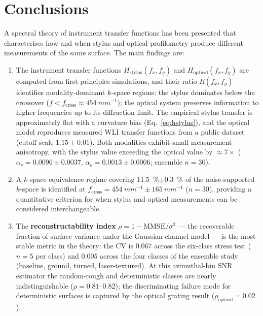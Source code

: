 \documentclass[review,12pt]{elsarticle}
\begin{document}
\section{Conclusions}

A spectral theory of instrument transfer functions has been presented that characterises how and when stylus and optical profilometry produce different measurements of the same surface. The main findings are:

\begin{enumerate}
    \item The instrument transfer functions $H_\mathrm{stylus}(f_x,f_y)$ and $H_\mathrm{optical}(f_x,f_y)$ are computed from first-principles simulations, and their ratio $R(f_x,f_y)$ identifies modality-dominant $k$-space regions: the stylus dominates below the crossover ($f < f_\mathrm{cross} \approx \SI{454}{mm^{-1}}$); the optical system preserves information to higher frequencies up to its diffraction limit. The empirical stylus transfer is approximately flat with a curvature bias (Eq.~\ref{eq:hstylus}), and the optical model reproduces measured WLI transfer functions from a public dataset (cutoff scale $1.15\pm0.01$). Both modalities exhibit small measurement anisotropy, with the stylus value exceeding the optical value by $\approx 7\times$ ($\alpha_s = 0.0096\pm0.0037$, $\alpha_o = 0.0013\pm0.0006$; ensemble $n=30$).

    \item A $k$-space equivalence regime covering \SI{11.5}{\percent}$\pm$\SI{0.3}{\percent} of the noise-supported $k$-space is identified at $f_\mathrm{cross} = \SI{454}{mm^{-1}}\pm\SI{165}{mm^{-1}}$ ($n=30$), providing a quantitative criterion for when stylus and optical measurements can be considered interchangeable.

    \item The \textbf{reconstructability index} $\rho = 1 - \mathrm{MMSE}/\sigma^2$ --- the recoverable fraction of surface variance under the Gaussian-channel model --- is the most stable metric in the theory: the CV is $0.067$ across the six-class stress test ($n=5$ per class) and $0.005$ across the four classes of the ensemble study (baseline, ground, turned, laser-textured). At this azimuthal-bin SNR estimator the random-rough and deterministic classes are nearly indistinguishable ($\rho = 0.81$--$0.82$); the discriminating failure mode for deterministic surfaces is captured by the optical grating result ($\rho_\mathrm{optical} = 0.02$).


\end{enumerate}
\end{document}
